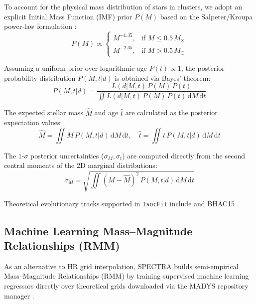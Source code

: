 \documentclass[fleqn,usenatbib]{mnras}
\begin{document}
To account for the physical mass distribution of stars in clusters, we adopt an explicit Initial Mass Function (IMF) prior $P(M)$ based on the Salpeter/Kroupa power-law formulation \citep{salpeter1955luminosity, kroupa2001variation}:
\begin{equation}
    P(M) \propto \begin{cases}
        M^{-1.35}, & \text{if } M \le 0.5\,M_\odot \\
        M^{-2.35}, & \text{if } M > 0.5\,M_\odot
    \end{cases}
    \label{eq:imf}
\end{equation}

Assuming a uniform prior over logarithmic age $P(t) \propto 1$, the posterior probability distribution $P(M, t | d)$ is obtained via Bayes' theorem:
\begin{equation}
    P(M, t | d) = \frac{L(d | M, t) \, P(M) \, P(t)}{\iint L(d | M, t) \, P(M) \, P(t) \, \mathrm{d}M \, \mathrm{d}t}
    \label{eq:posterior}
\end{equation}

The expected stellar mass $\hat{M}$ and age $\hat{t}$ are calculated as the posterior expectation values:
\begin{equation}
    \hat{M} = \iint M \, P(M, t | d) \, \mathrm{d}M \, \mathrm{d}t, \quad \hat{t} = \iint t \, P(M, t | d) \, \mathrm{d}M \, \mathrm{d}t
    \label{eq:expectation}
\end{equation}

The $1\text{-}\sigma$ posterior uncertainties ($\sigma_M, \sigma_t$) are computed directly from the second central moments of the 2D marginal distributions:
\begin{equation}
    \sigma_M = \sqrt{ \iint (M - \hat{M})^2 \, P(M, t | d) \, \mathrm{d}M \, \mathrm{d}t }
    \label{eq:mass_unc}
\end{equation}

Theoretical evolutionary tracks supported in \texttt{IsocFit} include \citet{siess2000internet} and BHAC15 \citep{baraffe2015new}.


\subsection{Machine Learning Mass--Magnitude Relationships (RMM)}
\label{sec:rmm}

As an alternative to HR grid interpolation, \textsc{SPECTRA} builds semi-empirical Mass--Magnitude Relationships (RMM) by training supervised machine learning regressors directly over theoretical grids downloaded via the \textsc{MADYS} repository manager \citep{lodieu2019fiveD}.
\end{document}
